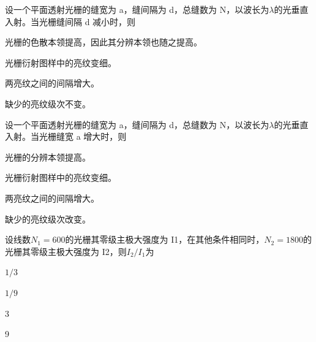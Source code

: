 \documentclass[padl, analysis, notocnum]{ExBook}
\newcommand{\answerarea}[1][3.5cm]{%
  \par\vspace{1mm}%
  \noindent{\color{themeColor!35}\rule{\linewidth}{0.4pt}}\par
  \noindent\begin{minipage}[t][#1][t]{\linewidth}\vspace{0pt}\end{minipage}\par
  \noindent{\color{themeColor!35}\rule{\linewidth}{0.4pt}}\par
}
\begin{document}
\begin{qitems}[startnum=12]
\qitem 设一个平面透射光栅的缝宽为 a，缝间隔为 d，总缝数为 N，以波长为$\lambda$的光垂直入射。当光栅缝间隔 d 减小时，则
\par\noindent\hspace{2em}光栅的色散本领提高，因此其分辨本领也随之提高。
\par\noindent\hspace{2em}光栅衍射图样中的亮纹变细。
\par\noindent\hspace{2em}两亮纹之间的间隔增大。
\par\noindent\hspace{2em}缺少的亮纹级次不变。
\label{q:270:start}
\answerarea[4.0cm]
\label{q:270:end}
\end{qitems}

\begin{qitems}[startnum=13]
\qitem 设一个平面透射光栅的缝宽为 a，缝间隔为 d，总缝数为 N，以波长为$\lambda$的光垂直入射。当光栅缝宽 a 增大时，则
\par\noindent\hspace{2em}光栅的分辨本领提高。
\par\noindent\hspace{2em}光栅衍射图样中的亮纹变细。
\par\noindent\hspace{2em}两亮纹之间的间隔增大。
\par\noindent\hspace{2em}缺少的亮纹级次改变。
\label{q:271:start}
\answerarea[4.0cm]
\label{q:271:end}
\end{qitems}

\begin{qitems}[startnum=14]
\qitem 设线数$N_{1}=600$的光栅其零级主极大强度为 I1，在其他条件相同时，$N_{2}=1800$的光栅其零级主极大强度为 I2，则$I_{2}/I_{1}$为
\par\noindent\hspace{2em}$1/3$
\par\noindent\hspace{2em}$1/9$
\par\noindent\hspace{2em}3
\par\noindent\hspace{2em}9
\label{q:272:start}
\answerarea[4.0cm]
\label{q:272:end}
\end{qitems}
\end{document}
